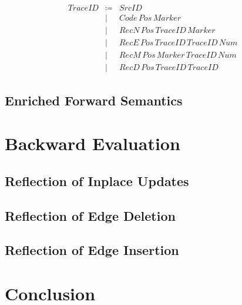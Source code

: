 \documentclass{llncs}
\begin{document}
$$\begin{array}{lll}
TraceID &\coloneqq	&SrcID\\
	&\mid		&Code\,Pos\,Marker\\
	&\mid		&RecN\,Pos\,TraceID\,Marker\\
	&\mid		&RecE\,Pos\,TraceID\,TraceID\,Num\\
	&\mid		&RecM\,Pos\,Marker\,TraceID\,Num\\
	&\mid		&RecD\,Pos\,TraceID\,TraceID
\end{array}$$

\subsection{Enriched Forward Semantics}\label{subsec:fwd-sem}


\section{Backward Evaluation}\label{sec:bak}

\subsection{Reflection of Inplace Updates}\label{subsec:bak-inp}

\subsection{Reflection of Edge Deletion}\label{subsec:bak-del}

\subsection{Reflection of Edge Insertion}\label{subsec:bak-ins}
\section{Conclusion}\label{sec:con}
\end{document}
